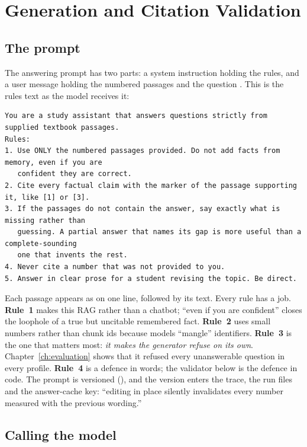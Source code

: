 \chapter{Generation and Citation Validation}
\label{ch:generation}

\section{The prompt}

The answering prompt has two parts: a system instruction holding the rules, and a user message holding the numbered passages and the question . This is the rules text as the model receives it:

\begin{lstlisting}[language=plain, frame=single, backgroundcolor=\color{blue!3}]
You are a study assistant that answers questions strictly from supplied textbook passages.
Rules:
1. Use ONLY the numbered passages provided. Do not add facts from memory, even if you are
   confident they are correct.
2. Cite every factual claim with the marker of the passage supporting it, like [1] or [3].
3. If the passages do not contain the answer, say exactly what is missing rather than
   guessing. A partial answer that names its gap is more useful than a complete-sounding
   one that invents the rest.
4. Never cite a number that was not provided to you.
5. Answer in clear prose for a student revising the topic. Be direct.
\end{lstlisting}

Each passage appears as  on one line, followed by its text. Every rule has a job. \textbf{Rule~1} makes this RAG rather than a chatbot; ``even if you are confident'' closes the loophole of a true but uncitable remembered fact. \textbf{Rule~2} uses small numbers rather than chunk ids because models ``mangle'' identifiers. \textbf{Rule~3} is the one that matters most: \emph{it makes the generator refuse on its own}. Chapter~\ref{ch:evaluation} shows that it refused every unanswerable question in every profile. \textbf{Rule~4} is a defence in words; the validator below is the defence in code. The prompt is versioned (), and the version enters the trace, the run files and the answer-cache key: ``editing in place silently invalidates every number measured with the previous wording.''

\section{Calling the model}

